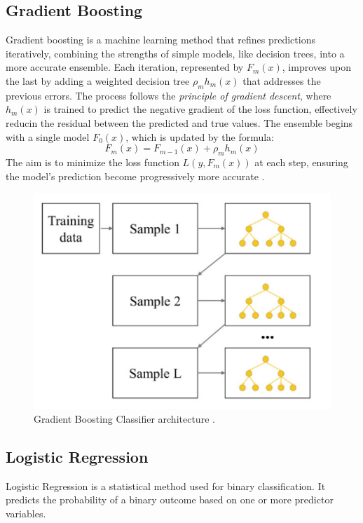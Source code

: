         \subsection{Gradient Boosting}
            Gradient boosting is a machine learning method that refines predictions iteratively, combining the strengths of simple models, like decision trees, into a more accurate ensemble. Each iteration, represented by $F_m(x)$, improves upon the last by adding a weighted decision tree $\rho_m h_m(x)$ that addresses the previous errors. The process follows the \textit{principle of gradient descent}, where $h_m(x)$ is trained to predict the negative gradient of the loss function, effectively reducin the residual between the predicted and true values. The ensemble begins with a single model $F_0(x)$, which is updated by the formula:
            \begin{equation}
                F_m(x) = F_{m-1}(x) + \rho_m h_m(x)
            \end{equation}
            The aim is to minimize the loss function $L(y, F_m(x))$ at each step, ensuring the model's prediction become progressively more accurate \cite{bentejac_comparative_2021}.
            \begin{figure}[H]
                \centering
                \includegraphics[width=.5\textwidth]{../src/resources/boosting.png}
                \caption{
                    Gradient Boosting Classifier architecture \cite{cha_comparison_2021}.
                }
                \label{fig:gradient_boosting}
            \end{figure}
        \subsection{Logistic Regression}
            Logistic Regression is a statistical method used for binary classification. It predicts the probability of a binary outcome based on one or more predictor variables. 

